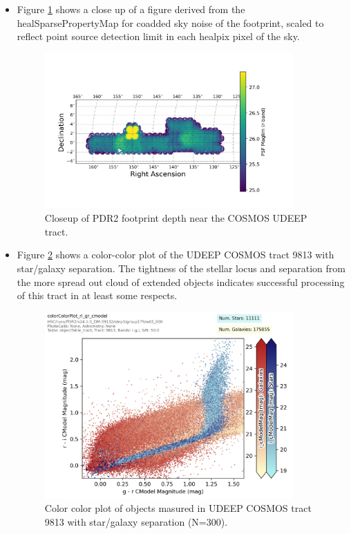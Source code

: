 \begin{itemize}

 \item Figure \ref{fig:footprint0} shows a close up of a figure derived from the healSparsePropertyMap for 
coadded sky noise of the footprint, scaled to reflect point source detection limit in each 
healpix pixel of the sky.

 \begin{figure}[h]
 \includegraphics[width=0.9\textwidth]{r-band-cosmos-pdr2.png}
	 \caption{Closeup of PDR2 footprint depth near the COSMOS UDEEP tract.  \label{fig:footprint0}}
 \end{figure}

\item Figure \ref{fig:colorcolor} shows a color-color plot of the UDEEP COSMOS tract 9813 with star/galaxy
separation.  The tightness of the stellar locus and separation from the more spread out cloud of extended
objects indicates successful processing of this tract in at least some respects.

 \begin{figure}[h]
 \includegraphics[width=0.9\textwidth]{colorColor9813.png}
	 \caption{Color color plot of objects masured in UDEEP COSMOS tract 9813 with star/galaxy separation (N=300).  \label{fig:colorcolor}}
 \end{figure}


\end{itemize}
